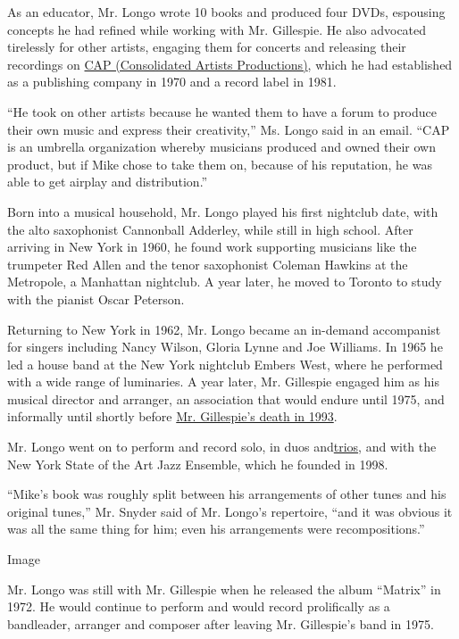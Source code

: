 As an educator, Mr. Longo wrote 10 books and produced four DVDs,
espousing concepts he had refined while working with Mr. Gillespie. He
also advocated tirelessly for other artists, engaging them for concerts
and releasing their recordings on
\href{https://jazztimes.com/archives/label-watch-consolidated-artists/}{CAP
(Consolidated Artists Productions)}, which he had established as a
publishing company in 1970 and a record label in 1981.

``He took on other artists because he wanted them to have a forum to
produce their own music and express their creativity,'' Ms. Longo said
in an email. ``CAP is an umbrella organization whereby musicians
produced and owned their own product, but if Mike chose to take them on,
because of his reputation, he was able to get airplay and
distribution.''

Born into a musical household, Mr. Longo played his first nightclub
date, with the alto saxophonist Cannonball Adderley, while still in high
school. After arriving in New York in 1960, he found work supporting
musicians like the trumpeter Red Allen and the tenor saxophonist Coleman
Hawkins at the Metropole, a Manhattan nightclub. A year later, he moved
to Toronto to study with the pianist Oscar Peterson.

Returning to New York in 1962, Mr. Longo became an in-demand accompanist
for singers including Nancy Wilson, Gloria Lynne and Joe Williams. In
1965 he led a house band at the New York nightclub Embers West, where he
performed with a wide range of luminaries. A year later, Mr. Gillespie
engaged him as his musical director and arranger, an association that
would endure until 1975, and informally until shortly before
\href{https://www.nytimes.com/1993/01/07/arts/dizzy-gillespie-who-sounded-some-of-modern-jazz-s-earliest-notes-dies-at-75.html}{Mr.
Gillespie's death in 1993}.

Mr. Longo went on to perform and record solo, in duos
and\href{https://www.youtube.com/watch?v=8bgr-fDptYQ}{trios}, and with
the New York State of the Art Jazz Ensemble, which he founded in 1998.

``Mike's book was roughly split between his arrangements of other tunes
and his original tunes,'' Mr. Snyder said of Mr. Longo's repertoire,
``and it was obvious it was all the same thing for him; even his
arrangements were recompositions.''

Image

Mr. Longo was still with Mr. Gillespie when he released the album
``Matrix'' in 1972. He would continue to perform and would record
prolifically as a bandleader, arranger and composer after leaving Mr.
Gillespie's band in 1975.

